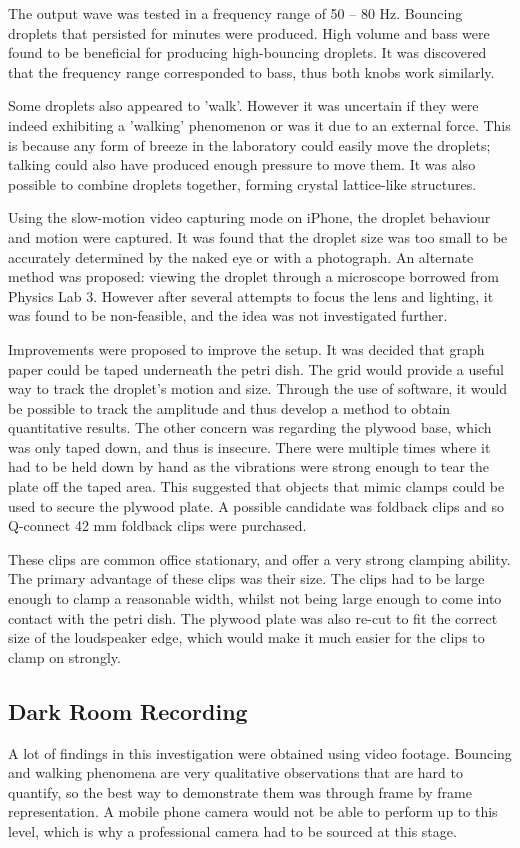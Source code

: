 The output wave was tested in a frequency range of 50 -- 80 Hz. Bouncing droplets that persisted for minutes were produced. High volume and bass were found to be beneficial for producing high-bouncing droplets. It was discovered that the frequency range corresponded to bass, thus both knobs work similarly.

Some droplets also appeared to 'walk'. However it was uncertain if they were indeed exhibiting a 'walking' phenomenon or was it due to an external force. This is because any form of breeze in the laboratory could easily move the droplets; talking could also have produced enough pressure to move them. It was also possible to combine droplets together, forming crystal lattice-like structures.

Using the slow-motion video capturing mode on iPhone, the droplet behaviour and motion were captured. It was found that the droplet size was too small to be accurately determined by the naked eye or with a photograph. An alternate method was proposed: viewing the droplet through a microscope borrowed from Physics Lab 3. However after several attempts to focus the lens and lighting, it was found to be non-feasible, and the idea was not investigated further.

Improvements were proposed to improve the setup. It was decided that graph paper could be taped underneath the petri dish. The grid would provide a useful way to track the droplet's motion and size. Through the use of software, it would be possible to track the amplitude and thus develop a method to obtain quantitative results. The other concern was regarding the plywood base, which was only taped down, and thus is insecure. There were multiple times where it had to be held down by  hand as the vibrations were strong enough to tear the plate off the taped area. This suggested that objects that mimic clamps could be used to secure the plywood plate. A possible candidate was foldback clips and so Q-connect 42 mm  foldback clips were purchased.


These clips are common office stationary, and offer a very strong clamping ability. The primary advantage of these clips was their size. The clips had to be large enough to clamp a reasonable width, whilst not being large enough to come into contact with the petri dish. The plywood plate was also re-cut to fit the correct size of the loudspeaker edge, which would make it much easier for the clips to clamp on strongly.

\subsection{Dark Room Recording}
A lot of findings in this investigation were obtained using video footage. Bouncing and walking phenomena are very qualitative observations that are hard to quantify, so the best way to demonstrate them was through frame by frame representation. A mobile phone camera would not be able to perform up to this level, which is why a professional camera had to be sourced at this stage.

